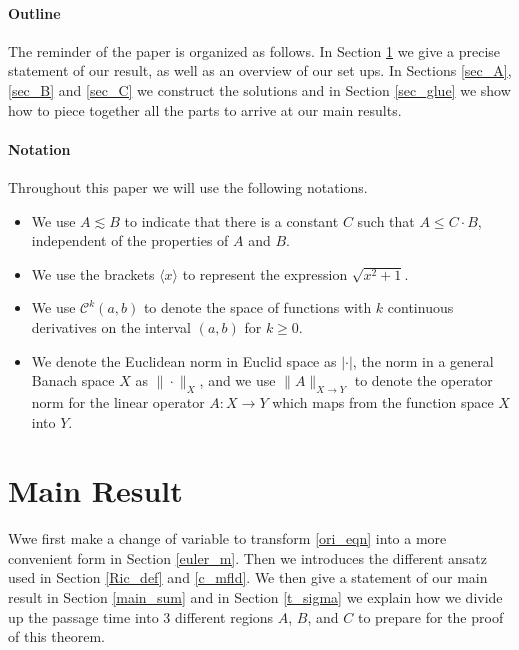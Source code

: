 \documentclass[letterpaper,11pt]{article}
\newcommand{\lar}{ \lesssim }
\numberwithin{equation}{section}
\theoremstyle{plain}
\begin{document}
\paragraph{Outline}
The reminder of the paper is organized as follows. In Section \ref{sec_main} we give a precise statement of our result, as well as an overview of our set ups. In Sections \ref{sec_A}, \ref{sec_B} and \ref{sec_C} we construct the solutions and in Section \ref{sec_glue} we show how to piece together all the parts to arrive at our main results.


\paragraph{Notation}Throughout this paper we will use the following notations.
\begin{itemize}
\item We use $A \lar B$ to indicate that there is a constant $C$ such that $A \le C \cdot B$, independent of the properties of $A$ and $B$.

\item We use the brackets $\langle x \rangle$ to represent the expression $\sqrt{x^2+1}$.

\item We use $\mathcal{C}^k(a,b)$ to denote the space of functions with $k$ continuous derivatives on the interval $(a,b)$ for $k\ge 0$. 

\item   We denote the Euclidean norm in Euclid space as $|\cdot|$, the norm in a general Banach space $X$ as $\|\cdot\|_X$, and we use $\|A\|_{X\to Y}$ to denote the operator norm for the linear operator $A: X\to Y$ which maps from the function space $X$ into $Y$.
\end{itemize}
  



\section{Main Result}\label{sec_main}
Wwe first make a change of variable to transform \eqref{ori_eqn} into a more convenient form in Section \ref{euler_m}. Then we introduces the different ansatz used in Section \ref{Ric_def} and \ref{c_mfld}. We then give a statement of our main result in Section \ref{main_sum} and in Section \ref{t_sigma} we explain how we divide up the passage time into 3 different regions $A$, $B$, and $C$ to prepare for the proof of this theorem.
\end{document}
